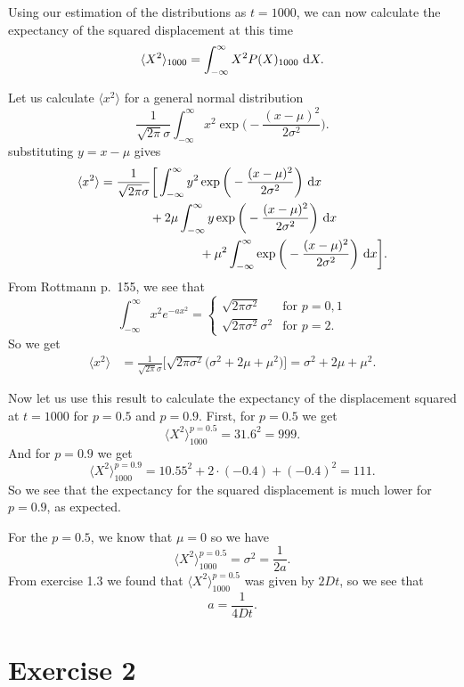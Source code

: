 \documentclass[a4paper, 11pt, notitlepage, english]{article}
\renewcommand{\d}{{\rm d}}
\begin{document}
Using our estimation of the distributions as $t=1000$, we can now calculate the expectancy of the squared displacement at this time
$$\langle X^2 \rangle_{1000} = \int_{-\infty}^\infty X^2 P(X)_{1000} \ \d X.$$

Let us calculate $\langle x^2\rangle$ for a general normal distribution
$$\frac{1}{\sqrt{2\pi}\sigma}\int_{-\infty}^\infty x^2 \exp\bigg(-\frac{(x-\mu)^2}{2\sigma^2}\bigg).$$
substituting $y=x-\mu$ gives
\begin{align*}
\langle x^2 \rangle &= \frac{1}{\sqrt{2\pi}\sigma}\bigg[\int_{-\infty}^\infty y^2 \exp\bigg(-\frac{(x-\mu)^2}{2\sigma^2}\bigg) \ \d x \\ &\qquad\qquad + 2\mu \int_{-\infty}^\infty  y \exp\bigg(-\frac{(x-\mu)^2}{2\sigma^2}\bigg) \ \d x \\&\qquad\qquad\qquad\qquad+ \mu^2 \int_{-\infty}^\infty \exp\bigg(-\frac{(x-\mu)^2}{2\sigma^2}\bigg) \ \d x\bigg].	
\end{align*}
From Rottmann p.\ 155, we see that
$$\int_{-\infty}^\infty x^2 e^{-ax^2} = \begin{cases}
	\sqrt{2\pi\sigma^2} & \mbox{for } p = 0, 1 \\
	\sqrt{2\pi\sigma^2}\sigma^2 & \mbox{for } p = 2.
\end{cases}$$
So we get
\begin{align*}
\langle x^2 \rangle &= \frac{1}{\sqrt{2\pi}\sigma}\bigg[\sqrt{2\pi\sigma^2}\bigg(\sigma^2 + 2\mu + \mu^2\bigg)\bigg] = \sigma^2 + 2\mu + \mu^2.	
\end{align*}

Now let us use this result to calculate the expectancy of the displacement squared at $t=1000$ for $p=0.5$ and $p=0.9$. First, for $p=0.5$ we get
$$\langle X^2\rangle_{1000}^{p=0.5} = 31.6^2 = 999.$$
And for $p=0.9$ we get
$$\langle X^2\rangle_{1000}^{p=0.9} = 10.55^2 + 2\cdot(-0.4) + (-0.4)^2 = 111.$$
So we see that the expectancy for the squared displacement is much lower for $p=0.9$, as expected.

For the $p=0.5$, we know that $\mu = 0$ so we have
$$\langle X^2 \rangle_{1000}^{p=0.5} = \sigma^2 = \frac{1}{2a}.$$
From exercise 1.3 we found that $\langle X^2 \rangle_{1000}^{p=0.5}$ was given by $2Dt$, so we see that
$$a = \frac{1}{4Dt}.$$

\clearpage

\section*{Exercise 2}
\end{document}
